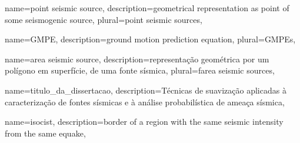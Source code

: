 {
	name={point seismic source},
	description={geometrical representation as point of some seismogenic source},
	plural={point seismic sources},
}

{
	name={GMPE},
	description={ground motion prediction equation},
	plural={GMPEs},
}


{
	name={area seismic source},
	description={representação geométrica por um polígono em superfície, 
				 de uma fonte sísmica},
	plural={farea seismic sources},
}

{
	name={titulo_da_dissertacao},
	description={Técnicas de suavização aplicadas
					à caracterização de fontes sísmicas e 
					à análise probabilística de ameaça sísmica},
}

{
	name={isocist},
	description={border of a region with the same seismic intensity from the same \gls{equake}},
}


